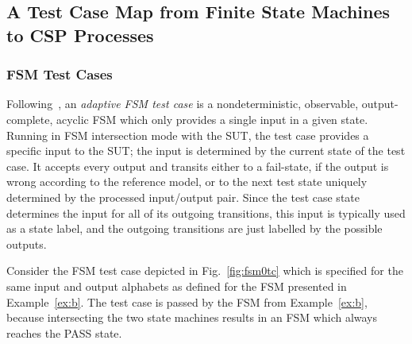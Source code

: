 \subsection{A Test Case Map from Finite State Machines to CSP Processes}
\label{sec:tcmap}

\subsubsection*{FSM Test Cases}

Following~\cite{DBLP:conf/hase/PetrenkoY14}, 
an \emph{adaptive FSM test case} is a nondeterministic, observable, output-complete, acyclic FSM which only provides a single input in a given state. Running in FSM intersection mode with the SUT, the test case provides a specific input to the SUT; the input is determined by the current state of the test case. It accepts every output and transits either to a fail-state, if the output is wrong according to the reference model, or to the next test state uniquely determined  by the processed input/output pair. Since the test case state determines the input for all of its outgoing transitions, this input is typically used as a state label, and the outgoing transitions are just labelled by the possible outputs.

\begin{example}
Consider the FSM test case depicted in Fig.~\ref{fig:fsm0tc} which is specified
for the same input and output alphabets as defined for  the FSM presented in Example~\ref{ex:b}. The test case is passed by the FSM from Example~\ref{ex:b}, because 
intersecting the two state machines results in an FSM which always reaches the PASS state.
\xbox
\end{example}


